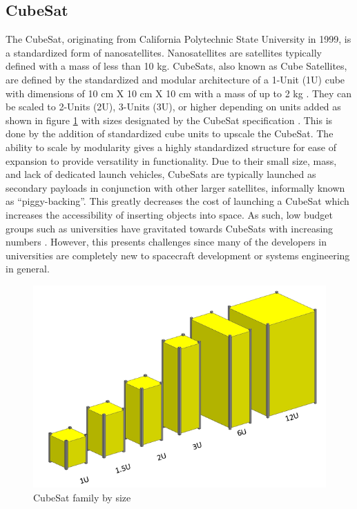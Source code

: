 \documentclass[journal,article,submit,pdftex,moreauthors]{Definitions/mdpi}
\begin{document}
\subsection{CubeSat}
The CubeSat, originating from California Polytechnic State University in 1999, is a standardized form of nanosatellites.  Nanosatellites are satellites typically defined with a mass of less than 10 kg.  CubeSats, also known as Cube Satellites, are defined by the standardized and modular architecture of a 1-Unit (1U) cube with dimensions of 10 cm X 10 cm X 10 cm with a mass of up to 2 kg \cite{cds_rev14}.  They can be scaled to 2-Units (2U), 3-Units (3U), or higher depending on units added as shown in figure \ref{fig:cubesat_family} with sizes designated by the CubeSat specification \cite{cds_rev14}.  This is done by the addition of standardized cube units to upscale the CubeSat.  The ability to scale by modularity gives a highly standardized structure for ease of expansion to provide versatility in functionality.  Due to their small size, mass, and lack of dedicated launch vehicles, CubeSats are typically launched as secondary payloads in conjunction with other larger satellites, informally known as “piggy-backing”.  This greatly decreases the cost of launching a CubeSat which increases the accessibility of inserting objects into space.  As such, low budget groups such as universities have gravitated towards CubeSats with increasing numbers \cite{swartwout_data}.  However, this presents challenges since many of the developers in universities are completely new to spacecraft development or systems engineering in general.

\begin{figure}[H]
    \includegraphics[width=10.5 cm]{assets/cubesat_family.png}
    \caption{CubeSat family by size \cite{cds_rev14}}
	\label{fig:cubesat_family}
    \end{figure}   
\unskip
\end{document}
